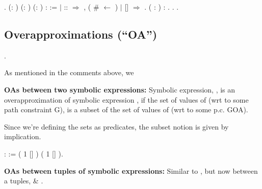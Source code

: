 \documentclass[12pt]{report}
\begin{document}
\begin{coqdoccode}
\coqdocindent{3.00em}
 .\coqdoceol
\coqdocemptyline
\coqdocindent{2.00em}
  (:  ) (: ) (:  ) :  :=\coqdoceol
\coqdocindent{3.00em}
  \coqdoceol
\coqdocindent{3.00em}
\ensuremath{|}  ::  \ensuremath{\Rightarrow} \coqdoctac{\ensuremath{\exists}} ,   ( \#  \ensuremath{\leftarrow} ) \coqdoceol
\coqdocindent{3.00em}
\ensuremath{|} []     \ensuremath{\Rightarrow}   \coqdoceol
\coqdocindent{3.00em}
.\coqdoceol
\coqdocemptyline
\coqdocindent{2.00em}
   ( :  ) :  .\coqdoceol
\coqdocindent{2.00em}
.\coqdoceol
\coqdocemptyline
\coqdocindent{1.00em}
     .\coqdoceol
\coqdocemptyline
\end{coqdoccode}
\subsection{Overapproximations (``OA'')}


\begin{coqdoccode}
\coqdocindent{1.00em}
 .\coqdoceol
\coqdocemptyline
\end{coqdoccode}
As mentioned in the comments above, we
    

 \textbf{OAs between two symbolic expressions:}
        Symbolic expression, , is an
        overapproximation of symbolic expression ,
        if the set of values of  (wrt to some path
        constraint G), is a subset of the set of values
        of  (wrt to some p.c. GOA).


        Since we're defining the sets as predicates,
        the subset notion is given by implication.


    
\begin{coqdoccode}
\coqdocindent{2.00em}
      :  :=\coqdoceol
\coqdocindent{3.00em}
 ( 1 [] ) ( 1 [] ).\coqdoceol
\coqdocemptyline
\end{coqdoccode}
\textbf{OAs between tuples of symbolic expressions:}
        Similar to , but now between a tuples,
         \& .
    
\end{document}
